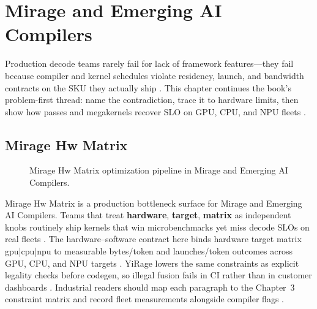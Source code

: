 \chapter{Mirage and Emerging AI Compilers}
\label{chap:ch20}

Production decode teams rarely fail for lack of framework features---they fail because compiler and kernel schedules violate residency, launch, and bandwidth contracts on the SKU they actually ship \citep{patel2025llminference,nvidia2022hopper}. This chapter continues the book's problem-first thread: name the contradiction, trace it to hardware limits, then show how passes and megakernels recover SLO on GPU, CPU, and NPU fleets \citep{taxbreak2026,semianalysis2024tma}.

\section{Mirage Hw Matrix}
\label{sec:mirage_hw_matrix}
\begin{figure}[t]
\centering
{}
\caption{Mirage Hw Matrix optimization pipeline in Mirage and Emerging AI Compilers.}
\label{fig:mirage_hw_matrix_pipeline}
\end{figure}


Mirage Hw Matrix is a production bottleneck surface for Mirage and Emerging AI Compilers. Teams that treat \textbf{hardware}, \textbf{target}, \textbf{matrix} as independent knobs routinely ship kernels that win microbenchmarks yet miss decode SLOs on real fleets \citep{patel2025llminference,nvidia2022hopper}. The hardware--software contract here binds hardware target matrix gpu|cpu|npu to measurable bytes/token and launches/token outcomes across GPU, CPU, and NPU targets \citep{taxbreak2026,semianalysis2024tma}. YiRage lowers the same constraints as explicit legality checks before codegen, so illegal fusion fails in CI rather than in customer dashboards \citep{memoryfloor2026,amd2024xdna}. Industrial readers should map each paragraph to the Chapter~3 constraint matrix and record fleet measurements alongside compiler flags \citep{nvidia2022hopper,amd2024aie}.

